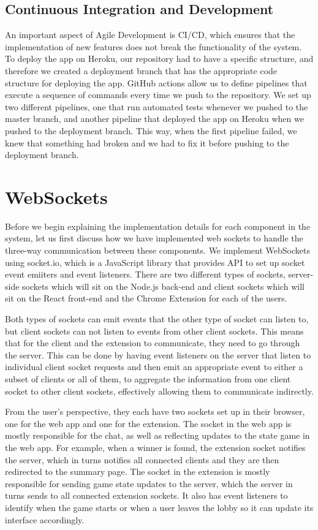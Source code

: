 \documentclass{l4proj}
\begin{document}
\subsection{Continuous Integration and Development}
An important aspect of Agile Development is CI/CD, which ensures that the implementation of new features does not break the functionality of the system. To deploy the app on Heroku, our repository had to have a specific structure, and therefore we created a deployment branch that has the appropriate code structure for deploying the app. GitHub actions allow us to define pipelines that execute a sequence of commands every time we push to the repository. We set up two different pipelines, one that run automated tests whenever we pushed to the master branch, and another pipeline that deployed the app on Heroku when we pushed to the deployment branch. This way, when the first pipeline failed, we knew that something had broken and we had to fix it before pushing to the deployment branch.

\section{WebSockets}
Before we begin explaining the implementation details for each component in the system, let us first discuss how we have implemented web sockets to handle the three-way communication between these components. We implement WebSockets using socket.io, which is a JavaScript library that provides API to set up socket event emiiters and event listeners. There are two different types of sockets, server-side sockets which will sit on the Node.js back-end and client sockets which will sit on the React front-end and the Chrome Extension for each of the users. 

Both types of sockets can emit events that the other type of socket can listen to, but client sockets can not listen to events from other client sockets. This means that for the client and the extension to communicate, they need to go through the server. This can be done by having event listeners on the server that listen to individual client socket requests and then emit an appropriate event to either a subset of clients or all of them, to aggregate the information from one client socket to other client sockets, effectively allowing them to communicate indirectly.

From the user's perspective, they each have two sockets set up in their browser, one for the web app and one for the extension. The socket in the web app is mostly responsible for the chat, as well as reflecting updates to the state game in the web app. For example, when a winner is found, the extension socket notifies the server, which in turns notifies all connected clients and they are then redirected to the summary page. The socket in the extension is mostly responsible for sending game state updates to the server, which the server in turns sends to all connected extension sockets. It also has event listeners to identify when the game starts or when a user leaves the lobby so it can update its interface accordingly.
\end{document}
